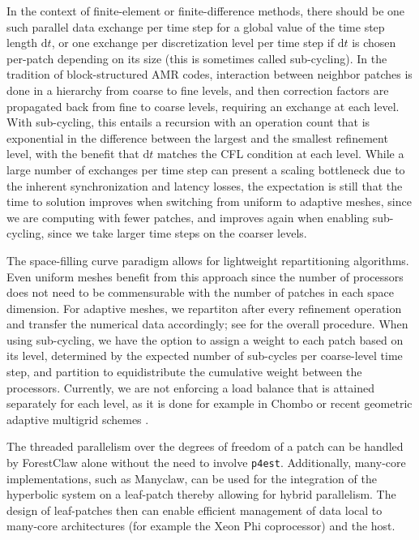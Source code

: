 \documentclass{IOS-Book-Article}     %
\newcommand{\dt}{\mathrm{d}t}
\newcommand{\forestclaw}{ForestClaw\xspace}
\newcommand{\pforest}{\texttt{p4est}\xspace}
\newcommand{\manyclaw}{Manyclaw\xspace}
\begin{document}
In the context of finite-element or finite-difference methods, there should be
one such parallel data exchange per time step for a global value of the time
step length $\dt$, or one exchange per discretization level per time step if
$\dt$ is chosen per-patch depending on its size (this is sometimes called
sub-cycling).  In the tradition of block-structured AMR codes, interaction
between neighbor patches is done in a hierarchy from coarse to fine levels, and
then correction factors are propagated back from fine to coarse levels, requiring
an exchange at each level.  With sub-cycling, this entails a recursion with an
operation count that is exponential in the difference between the largest and
the smallest refinement level, with the benefit that $\dt$ matches the CFL
condition at each level.  While a large number of exchanges per time step can
present a scaling bottleneck due to the inherent synchronization and latency
losses, the expectation is still that the time to solution improves when
switching from uniform to adaptive meshes, since we are computing with fewer
patches, and improves again when enabling sub-cycling, since we take larger
time steps on the coarser levels.

The space-filling curve paradigm allows for lightweight repartitioning
algorithms.  Even uniform meshes benefit from this approach since the number of
processors does not need to be commensurable with the number of patches in each
space dimension.  For adaptive meshes, we repartiton after every refinement
operation and transfer the numerical data accordingly; see \cite[Fig.\
4]{BursteddeGhattasStadlerEtAl08} for the overall procedure.  When using
sub-cycling, we have the option to assign a weight to each patch based on its
level, determined by the expected number of sub-cycles per coarse-level time
step, and partition to equidistribute the cumulative weight between the
processors.  Currently, we are not enforcing a load balance that is attained
separately for each level, as it is done for example in Chombo
\cite{ColellaGravesKeenEtAl07} or recent geometric adaptive multigrid schemes
\cite{SundarBirosBursteddeEtAl12}.

The threaded parallelism over the degrees of freedom of a patch can be handled
by \forestclaw alone without the need to involve \pforest.  Additionally,
many-core implementations, such as \manyclaw \cite{manyclaw}, can be used for
the integration of the hyperbolic system on a leaf-patch thereby allowing for
hybrid parallelism.  The design of leaf-patches then can enable efficient
management of data local to many-core architectures (for example the Xeon Phi
coprocessor) and the host.
\end{document}
